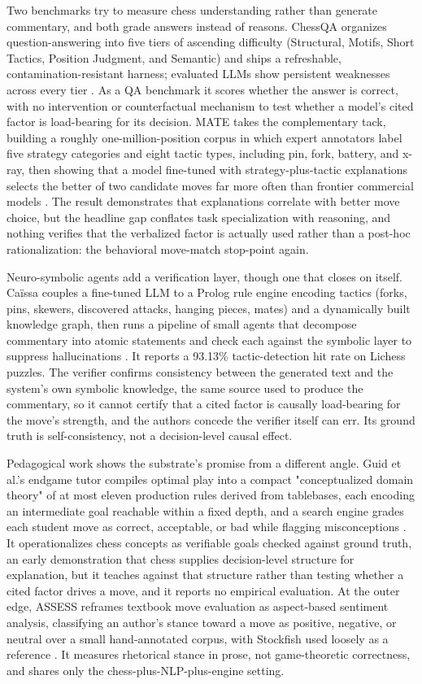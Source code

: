 \documentclass[conference]{IEEEtran}
\begin{document}
Two benchmarks try to measure chess understanding rather than generate commentary, and both grade answers instead of reasons. ChessQA organizes question-answering into five tiers of ascending difficulty (Structural, Motifs, Short Tactics, Position Judgment, and Semantic) and ships a refreshable, contamination-resistant harness; evaluated LLMs show persistent weaknesses across every tier \cite{ref13}. As a QA benchmark it scores whether the answer is correct, with no intervention or counterfactual mechanism to test whether a model's cited factor is load-bearing for its decision. MATE takes the complementary tack, building a roughly one-million-position corpus in which expert annotators label five strategy categories and eight tactic types, including pin, fork, battery, and x-ray, then showing that a model fine-tuned with strategy-plus-tactic explanations selects the better of two candidate moves far more often than frontier commercial models \cite{ref47}. The result demonstrates that explanations correlate with better move choice, but the headline gap conflates task specialization with reasoning, and nothing verifies that the verbalized factor is actually used rather than a post-hoc rationalization: the behavioral move-match stop-point again.

Neuro-symbolic agents add a verification layer, though one that closes on itself. Caïssa couples a fine-tuned LLM to a Prolog rule engine encoding tactics (forks, pins, skewers, discovered attacks, hanging pieces, mates) and a dynamically built knowledge graph, then runs a pipeline of small agents that decompose commentary into atomic statements and check each against the symbolic layer to suppress hallucinations \cite{ref54}. It reports a 93.13\% tactic-detection hit rate on Lichess puzzles. The verifier confirms consistency between the generated text and the system's own symbolic knowledge, the same source used to produce the commentary, so it cannot certify that a cited factor is causally load-bearing for the move's strength, and the authors concede the verifier itself can err. Its ground truth is self-consistency, not a decision-level causal effect.

Pedagogical work shows the substrate's promise from a different angle. Guid et al.'s endgame tutor compiles optimal play into a compact "conceptualized domain theory" of at most eleven production rules derived from tablebases, each encoding an intermediate goal reachable within a fixed depth, and a search engine grades each student move as correct, acceptable, or bad while flagging misconceptions \cite{ref56}. It operationalizes chess concepts as verifiable goals checked against ground truth, an early demonstration that chess supplies decision-level structure for explanation, but it teaches against that structure rather than testing whether a cited factor drives a move, and it reports no empirical evaluation. At the outer edge, ASSESS reframes textbook move evaluation as aspect-based sentiment analysis, classifying an author's stance toward a move as positive, negative, or neutral over a small hand-annotated corpus, with Stockfish used loosely as a reference \cite{ref61}. It measures rhetorical stance in prose, not game-theoretic correctness, and shares only the chess-plus-NLP-plus-engine setting.
\end{document}
